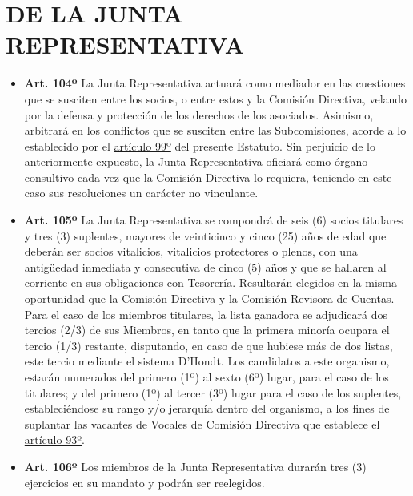 \documentclass[]{book}
\providecommand{\tightlist}{%
  \setlength{\itemsep}{0pt}\setlength{\parskip}{0pt}}
\begin{document}
\chapter{DE LA JUNTA REPRESENTATIVA}\label{cap21}

\begin{itemize}
\tightlist
\item
  \textbf{Art. 104º} La Junta Representativa actuará como mediador en
  las cuestiones que se susciten entre los socios, o entre estos y la
  Comisión Directiva, velando por la defensa y protección de los
  derechos de los asociados. Asimismo, arbitrará en los conflictos que
  se susciten entre las Subcomisiones, acorde a lo establecido por el
  \protect\hyperlink{art99}{artículo 99º} del presente Estatuto. Sin
  perjuicio de lo anteriormente expuesto, la Junta Representativa
  oficiará como órgano consultivo cada vez que la Comisión Directiva lo
  requiera, teniendo en este caso sus resoluciones un carácter no
  vinculante.
\end{itemize}

\begin{itemize}
\tightlist
\item
  \textbf{Art. 105º} La Junta Representativa se compondrá de seis (6)
  socios titulares y tres (3) suplentes, mayores de veinticinco y cinco
  (25) años de edad que deberán ser socios vitalicios, vitalicios
  protectores o plenos, con una antigüedad inmediata y consecutiva de
  cinco (5) años y que se hallaren al corriente en sus obligaciones con
  Tesorería. Resultarán elegidos en la misma oportunidad que la Comisión
  Directiva y la Comisión Revisora de Cuentas. Para el caso de los
  miembros titulares, la lista ganadora se adjudicará dos tercios (2/3)
  de sus Miembros, en tanto que la primera minoría ocupara el tercio
  (1/3) restante, disputando, en caso de que hubiese más de dos listas,
  este tercio mediante el sistema D'Hondt. Los candidatos a este
  organismo, estarán numerados del primero (1º) al sexto (6º) lugar,
  para el caso de los titulares; y del primero (1º) al tercer (3º) lugar
  para el caso de los suplentes, estableciéndose su rango y/o jerarquía
  dentro del organismo, a los fines de suplantar las vacantes de Vocales
  de Comisión Directiva que establece el
  \protect\hyperlink{art93}{artículo 93º}.
\end{itemize}

\begin{itemize}
\tightlist
\item
  \textbf{Art. 106º} Los miembros de la Junta Representativa durarán
  tres (3) ejercicios en su mandato y podrán ser reelegidos.
\end{itemize}
\end{document}
